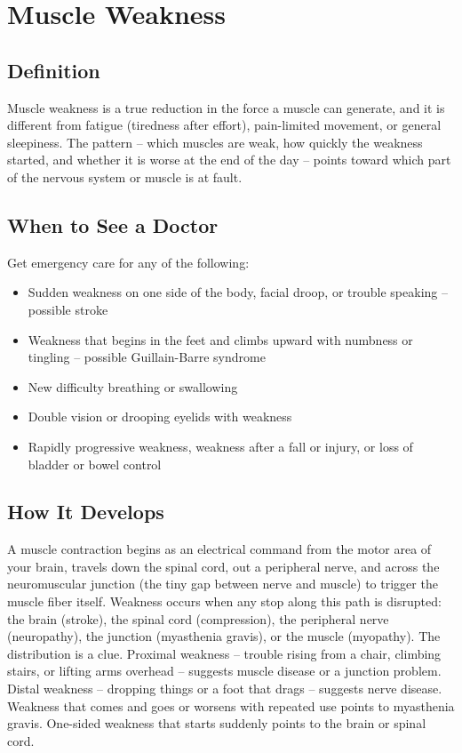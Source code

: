 \chapter{Muscle Weakness}

\section*{Definition}
Muscle weakness is a true reduction in the force a muscle can generate, and it is different from fatigue (tiredness after effort), pain-limited movement, or general sleepiness. The pattern -- which muscles are weak, how quickly the weakness started, and whether it is worse at the end of the day -- points toward which part of the nervous system or muscle is at fault.

\section*{When to See a Doctor}
Get emergency care for any of the following:
\begin{itemize}
  \item Sudden weakness on one side of the body, facial droop, or trouble speaking -- possible stroke
  \item Weakness that begins in the feet and climbs upward with numbness or tingling -- possible Guillain-Barre syndrome
  \item New difficulty breathing or swallowing
  \item Double vision or drooping eyelids with weakness
  \item Rapidly progressive weakness, weakness after a fall or injury, or loss of bladder or bowel control
\end{itemize}

\section*{How It Develops}
A muscle contraction begins as an electrical command from the motor area of your brain, travels down the spinal cord, out a peripheral nerve, and across the neuromuscular junction (the tiny gap between nerve and muscle) to trigger the muscle fiber itself. Weakness occurs when any stop along this path is disrupted: the brain (stroke), the spinal cord (compression), the peripheral nerve (neuropathy), the junction (myasthenia gravis), or the muscle (myopathy). The distribution is a clue. Proximal weakness -- trouble rising from a chair, climbing stairs, or lifting arms overhead -- suggests muscle disease or a junction problem. Distal weakness -- dropping things or a foot that drags -- suggests nerve disease. Weakness that comes and goes or worsens with repeated use points to myasthenia gravis. One-sided weakness that starts suddenly points to the brain or spinal cord.

